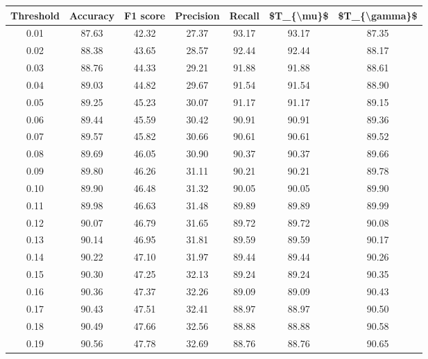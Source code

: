 \begin{tabular}{|c|c|c|c|c|c|c|}
\hline
 Threshold &  Accuracy &  F1 score &  Precision &  Recall &  \$T\_\{\textbackslash mu\}\$ &  \$T\_\{\textbackslash gamma\}\$ \\
\hline
      0.01 &     87.63 &     42.32 &      27.37 &   93.17 &      93.17 &         87.35 \\
      0.02 &     88.38 &     43.65 &      28.57 &   92.44 &      92.44 &         88.17 \\
      0.03 &     88.76 &     44.33 &      29.21 &   91.88 &      91.88 &         88.61 \\
      0.04 &     89.03 &     44.82 &      29.67 &   91.54 &      91.54 &         88.90 \\
      0.05 &     89.25 &     45.23 &      30.07 &   91.17 &      91.17 &         89.15 \\
      0.06 &     89.44 &     45.59 &      30.42 &   90.91 &      90.91 &         89.36 \\
      0.07 &     89.57 &     45.82 &      30.66 &   90.61 &      90.61 &         89.52 \\
      0.08 &     89.69 &     46.05 &      30.90 &   90.37 &      90.37 &         89.66 \\
      0.09 &     89.80 &     46.26 &      31.11 &   90.21 &      90.21 &         89.78 \\
      0.10 &     89.90 &     46.48 &      31.32 &   90.05 &      90.05 &         89.90 \\
      0.11 &     89.98 &     46.63 &      31.48 &   89.89 &      89.89 &         89.99 \\
      0.12 &     90.07 &     46.79 &      31.65 &   89.72 &      89.72 &         90.08 \\
      0.13 &     90.14 &     46.95 &      31.81 &   89.59 &      89.59 &         90.17 \\
      0.14 &     90.22 &     47.10 &      31.97 &   89.44 &      89.44 &         90.26 \\
      0.15 &     90.30 &     47.25 &      32.13 &   89.24 &      89.24 &         90.35 \\
      0.16 &     90.36 &     47.37 &      32.26 &   89.09 &      89.09 &         90.43 \\
      0.17 &     90.43 &     47.51 &      32.41 &   88.97 &      88.97 &         90.50 \\
      0.18 &     90.49 &     47.66 &      32.56 &   88.88 &      88.88 &         90.58 \\
      0.19 &     90.56 &     47.78 &      32.69 &   88.76 &      88.76 &         90.65 \\

\end{tabular}
